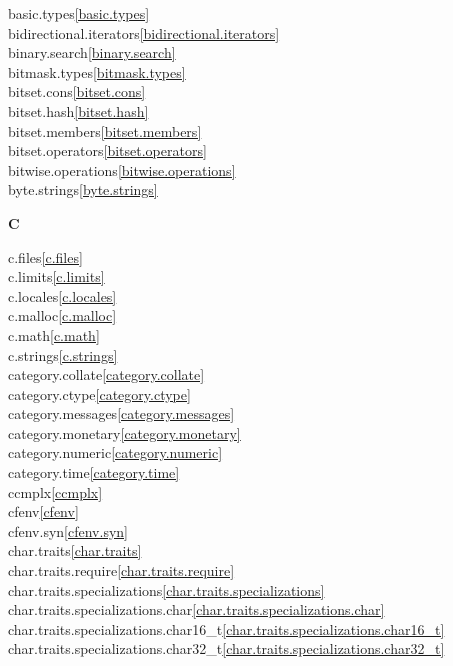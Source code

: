 \begin{multicols}{2}
basic.types\quad\ref{basic.types}\\
bidirectional.iterators\quad\ref{bidirectional.iterators}\\
binary.search\quad\ref{binary.search}\\
bitmask.types\quad\ref{bitmask.types}\\
bitset.cons\quad\ref{bitset.cons}\\
bitset.hash\quad\ref{bitset.hash}\\
bitset.members\quad\ref{bitset.members}\\
bitset.operators\quad\ref{bitset.operators}\\
bitwise.operations\quad\ref{bitwise.operations}\\
byte.strings\quad\ref{byte.strings}\\
\par \textbf{C}\par
c.files\quad\ref{c.files}\\
c.limits\quad\ref{c.limits}\\
c.locales\quad\ref{c.locales}\\
c.malloc\quad\ref{c.malloc}\\
c.math\quad\ref{c.math}\\
c.strings\quad\ref{c.strings}\\
category.collate\quad\ref{category.collate}\\
category.ctype\quad\ref{category.ctype}\\
category.messages\quad\ref{category.messages}\\
category.monetary\quad\ref{category.monetary}\\
category.numeric\quad\ref{category.numeric}\\
category.time\quad\ref{category.time}\\
ccmplx\quad\ref{ccmplx}\\
cfenv\quad\ref{cfenv}\\
cfenv.syn\quad\ref{cfenv.syn}\\
char.traits\quad\ref{char.traits}\\
char.traits.require\quad\ref{char.traits.require}\\
char.traits.specializations\quad\ref{char.traits.specializations}\\
char.traits.specializations.char\quad\ref{char.traits.specializations.char}\\
char.traits.specializations.char16_t\quad\ref{char.traits.specializations.char16_t}\\
char.traits.specializations.char32_t\quad\ref{char.traits.specializations.char32_t}\\

\end{multicols}
